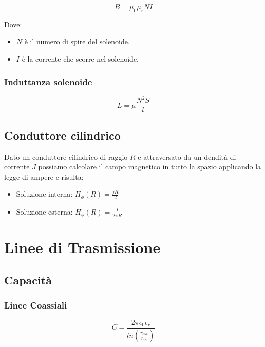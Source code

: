 \documentclass[10pt,a4paper]{report}
\begin{document}
			\begin{equation}
			B=\mu_0\mu_rNI
			\end{equation}

			Dove:

			\begin{itemize}
			\item $N$ è il numero di spire del solenoide.
			\item $I$ è la corrente che scorre nel solenoide.
			\end{itemize}

		\subsection{Induttanza solenoide}
				\begin{equation} 
				L=\mu \frac{N^2S}{l}
				\label{eq:induttanza-solenoide}
				\end{equation}

	\section{Conduttore cilindrico}
		Dato un conduttore cilindrico di raggio $R$ e attraversato da un dendità di corrente $J$ possiamo calcolare il campo magnetico in tutto la spazio applicando la legge di ampere e risulta:

		\begin{itemize}
		\item Soluzione interna: $H_\phi(R)=\frac{jR}{2}$ 
		\item Soluzione esterna: $H_\phi(R)=\frac{I}{2\pi R}$

		\end{itemize}

\chapter{Linee di Trasmissione}

	\section{Capacità}

	
		\subsection{Linee Coassiali}
				\begin{equation}
				C=\frac{2\pi \epsilon_0 \epsilon_r} {ln (\frac { r_{out}} {r_{in} } )}
				\end{equation}
\end{document}
